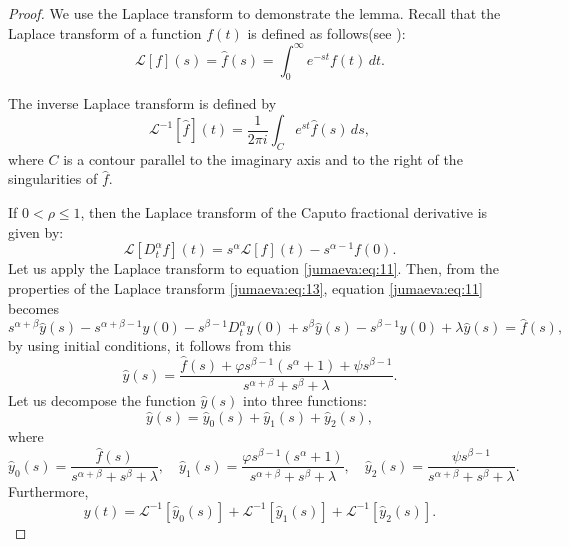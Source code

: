 \documentclass{amsart}
\numberwithin{equation}{section}
\begin{document}
\begin{proof}
We use the Laplace transform to demonstrate the lemma. Recall that the Laplace transform of a function $f(t)$ is defined as follows(see \cite{jumaeva:ref:33}):
\begin{equation*}
\mathcal{L}[f](s) = \hat{f}(s) = \int_0^{\infty} e^{-st} f(t)\,dt.
\end{equation*}

The inverse Laplace transform is defined by
\begin{equation*}
\mathcal{L}^{-1}[\hat{f}](t) = \frac{1}{2\pi i} \int_C e^{st} \hat{f}(s)\,ds,
\end{equation*}
where $C$ is a contour parallel to the imaginary axis and to the right of the singularities of $\hat{f} $.

If $0<\rho \leq 1$, then the Laplace transform of the Caputo fractional derivative is given by:
\begin{equation}
\mathcal{L} [D^{\alpha}_{t} f](t)=s^{\alpha} \mathcal{L} [f](t)-s^{\alpha-1} f(0).\label{jumaeva:eq:13}
\end{equation}
Let us apply the Laplace transform to equation  \eqref{jumaeva:eq:11}. Then, from the properties of the Laplace transform \eqref{jumaeva:eq:13}, equation \eqref{jumaeva:eq:11} becomes 
\begin{equation*}
s^{\alpha+\beta}\hat{y}(s)-s^{\alpha+\beta-1}y(0)-s^{\beta-1}D_t^\alpha y(0)+s^\beta\hat{y}(s)-s^{\beta-1}y(0)+\lambda \hat{y}(s)=\hat{f}(s),
\end{equation*}
by using initial conditions, it follows from this
\begin{equation*}
\hat{y}(s)=\frac{\hat{f}(s)+\varphi s^{\beta-1}(s^\alpha+1)+\psi s^{\beta-1}}{s^{\alpha+\beta}+s^\beta+\lambda}.
\end{equation*}
Let us decompose the function $\hat{y}(s)$ into three functions:
\begin{equation*}
\hat{y}(s)=\hat{y}_0(s)+\hat{y}_1(s)+\hat{y}_2(s),
\end{equation*}
where
\begin{equation*}
\hat{y}_0(s)=\frac{\hat{f}(s)}{s^{\alpha+\beta}+s^\beta+\lambda},\quad \hat{y}_1(s)=\frac{\varphi s^{\beta-1}(s^\alpha+1)}{s^{\alpha+\beta}+s^\beta+\lambda}, \quad
\hat{y}_2(s)=\frac{\psi s^{\beta-1}}{s^{\alpha+\beta}+s^\beta+\lambda}.
\end{equation*}
 Furthermore, 
 \begin{equation}
 y(t)=\mathcal{L}^{-1}[\hat{y}_0(s)]+\mathcal{L}^{-1}[\hat{y}_1(s)]+\mathcal{L}^{-1}[\hat{y}_2(s)].\label{jumaeva:eq:14}

\end{equation}
\end{proof}
\end{document}
